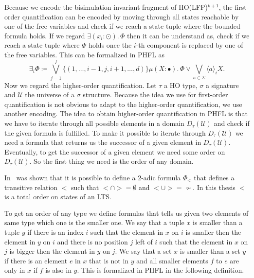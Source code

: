 Because we encode the bisimulation-invariant fragment of HO(LFP)$^{k + 1}$, the first-order quantification can be
encoded by moving through all states reachable by one of the free variables and check if we reach a state tuple where
the bounded formula holds. If we regard $\exists (x_i \colon \odot).\,\Phi$ then it can be understand as, check if we
reach a state tuple where $\Phi$ holds once the $i$-th component is replaced by one of the free variables. This can
be formalized in PHFL as
\[\exists_i \Phi \coloneqq \bigvee_{j=1}^f \{(1, \dots, i-1, j, i + 1, \dots, d)\} \mu (X
\colon \bullet).\,\Phi \vee \bigvee_{a \in \Sigma} \langle a \rangle_i X.\]
Now we regard the higher-order quantification. Let $\tau$ a HO type, $\sigma$ a signature and $\mathcal{U}$ the
universe of a $\sigma$ structure. Because the idea we use for first-order quantification is not obvious to adapt to
the higher-order quantification, we use another encoding. The idea to obtain higher-order quantification in PHFL is that
we have to iterate through all possible elements in a domain $D_\tau(\mathcal{U})$ and check if the given formula is
fulfilled. To make it possible to iterate through $D_\tau(\mathcal{U})$ we need a formula that returns us the
successor of a given element in $D_\tau(\mathcal{U})$. Eventually, to get the successor of a given element we need some
order on $D_\tau(\mathcal{U})$. So the first thing we need is the order of any domain.

\begin{remark}
    In~\cite{otto1999bisimulation} was shown that it is possible to define a $2$-adic formula $\Phi_<$ that defines a
    transitive relation $<$ such that $< \cap > = \emptyset$ and $< \cup > = \not\sim$. In this thesis $<$ is a total
    order on states of an LTS.
\end{remark}

To get an order of any type we define formulas that tells us given two elements of same type which one is the smaller
one. We say that a tuple $x$ is smaller than a tuple $y$ if there is an index $i$ such that the element in $x$ on $i$
is smaller then the element in $y$ on $i$ and there is no position $j$ left of $i$ such that the element in $x$ on
$j$ is bigger then the element in $y$ on $j$. We say that a set $x$ is smaller than a set $y$ if there is an element
$e$ in $x$ that is not in $y$ and all smaller elements $f$ to $e$ are only in $x$ if $f$ is also in $y$. This is
formalized in PHFL in the following definition.

